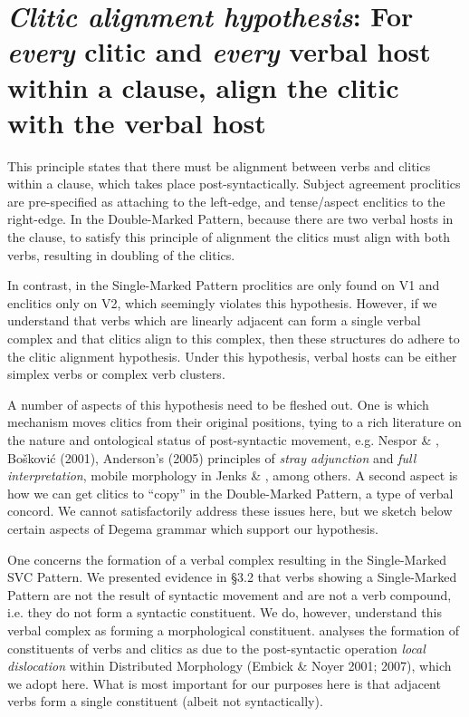 \chapter[Clitic alignment hypothesis: For every clitic and every verbal host within a clause, align the clitic with the verbal host]{\textit{Clitic alignment hypothesis}\textbf{: }For \textit{every} clitic and \textit{every} verbal host within a clause, align the clitic with the verbal host}

This principle states that there must be alignment between verbs and clitics within a clause, which takes place post-syntactically. Subject agreement proclitics are pre-specified as attaching to the left-edge, and tense/aspect enclitics to the right-edge. In the Double-Marked Pattern, because there are two verbal hosts in the clause, to satisfy this principle of alignment the clitics must align with both verbs, resulting in doubling of the clitics. 

In contrast, in the Single-Marked Pattern proclitics are only found on V1 and enclitics only on V2, which seemingly violates this hypothesis. However, if we understand that verbs which are linearly adjacent can form a single verbal complex and that clitics align to this complex, then these structures do adhere to the clitic alignment hypothesis. Under this hypothesis, verbal hosts can be either simplex verbs or complex verb clusters.

  A number of aspects of this hypothesis need to be fleshed out. One is which mechanism moves clitics from their original positions, tying to a rich literature on the nature and ontological status of post-syntactic movement, e.g. Nespor \& \citet{Vogel1986}, Bošković (2001), Anderson’s (2005) principles of \textit{stray adjunction }and\textit{ full interpretation}, mobile morphology in Jenks \& \citet{Rose2015}, among others. A second aspect is how we can get clitics to “copy” in the Double-Marked Pattern, a type of verbal concord. We cannot satisfactorily address these issues here, but we sketch below certain aspects of Degema grammar which support our hypothesis. 

One concerns the formation of a verbal complex resulting in the Single-Marked SVC Pattern. We presented evidence in §3.2 that verbs showing a Single-Marked Pattern are not the result of syntactic movement and are not a verb compound, i.e. they do not form a syntactic constituent. We do, however, understand this verbal complex as forming a morphological constituent. \citet{Rolle2015} analyses the formation of constituents of verbs and clitics as due to the post-syntactic operation \textit{local dislocation }within Distributed Morphology (Embick \& Noyer 2001; 2007), which we adopt here. What is most important for our purposes here is that adjacent verbs form a single constituent (albeit not syntactically). 

